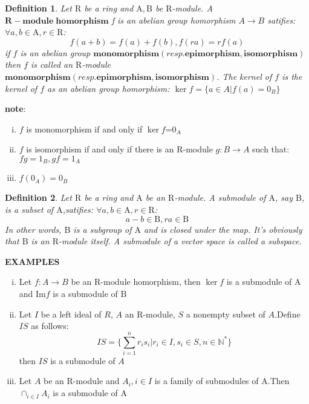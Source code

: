 \documentclass[a4paper]{article}
\newtheorem{myDef}{Definition}
\newcommand{\N}{\mathbb{N}}
\begin{document}
    \begin{myDef}
        Let $\mathrm{R}$ be a ring and $\mathrm{A,B}$ be $\mathrm{R}$-module. A $\mathbf{R-module \;homorphism}$ f is an abelian group homorphism
        $A\rightarrow B$ satifies:$\forall a,b\in \mathrm{A},r\in \mathrm{R}$:\\
        $$
        f(a+b)=f(a)+f(b),f(ra)=rf(a)
        $$ 
        if $f$ is an abelian group $\mathbf{monomorphism}(resp.\mathbf{epimorphism,isomorphism})$ then $f$ is called an $\mathrm{R}$-module $\mathbf{monomorphism}(resp.\mathbf{epimorphism,isomorphism})$.
    The kernel of $f$ is the kernel of $f$ as an abelian group homorphism: $\ker f=\{a\in A|f(a)=0_B\}$
    \end{myDef}
    \noindent
    \textbf{note}:
    \begin{enumerate}[(i)]
        \item $f$ is monomorphism if and only if $\ker f$={$0_A$}
        \item $f$ is isomorphism if and only if there is an R-module $g:B\rightarrow A$ such that:$fg=1_B,gf=1_A$
        \item $f(0_A)=0_B$
    \end{enumerate}
    \vspace{0.5cm}
    \begin{myDef}
        Let $\mathrm{R}$ be a ring and $\mathrm{A}$ be an $\mathrm{R}$-module. A submodule of $\mathrm{A}$, say $\mathrm{B}$, is a subset of $\mathrm{A}$,satifies:
        $\forall a,b\in \mathrm{A}, r\in \mathrm{R}$:
        $$
        a-b\in \mathrm{B},ra\in \mathrm{B}
        $$
        In other words, $\mathrm{B}$ is a subgroup of $\mathrm{A}$ and is closed under the map. It's obviously that $\mathrm{B}$ is an $\mathrm{R}$-module itself. A submodule of a 
        vector space is called a subspace.
    \end{myDef}
    \textbf{EXAMPLES}
    \noindent
    \begin{enumerate}[(i)]
        \item Let $f:A\rightarrow B$ be an $\mathrm{R}$-module homorphism, then $\ker f$ is a submodule of $\mathrm{A}$ and $\mathrm{Im} f$ is a submodule of $\mathrm{B}$
        \item Let $I$ be a left ideal of $R$, $A$ an $\mathrm{R}$-module, $S$ a nonempty subset of $A$.Define $IS$ as follows:\\
        $$
        IS=\{\sum_{i=1}^nr_is_i|r_i\in I, s_i\in S, n\in \N^{*}\}
        $$
        then $IS$ is a submodule of $A$
        \item Let $A$ be an $\mathrm{R}$-module and $A_i,i\in I$ is a family of submodules of $\mathrm{A}$.Then $\cap_{i\in I}A_i$ is a submodule of $\mathrm{A}$
    \end{enumerate}
\end{document}
